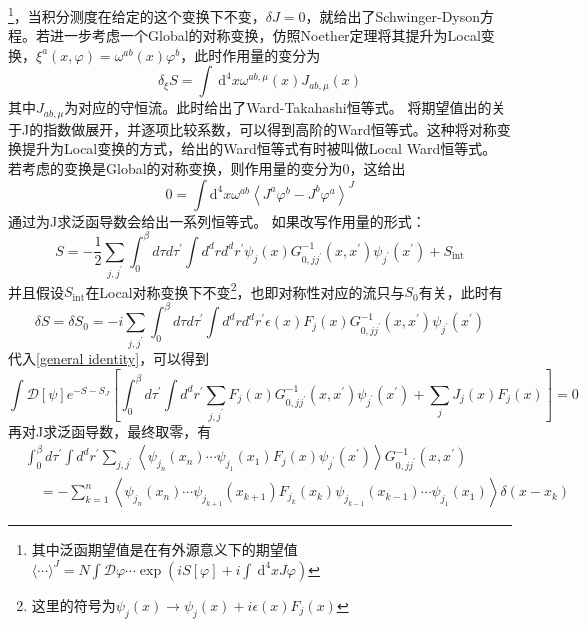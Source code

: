 \documentclass[10pt,openany]{book}
\theoremstyle{thmstyle} %
\theoremstyle{defstyle} %
\theoremstyle{prostyle} %
\begin{document}
\footnote{其中泛函期望值是在有外源意义下的期望值$ \langle\cdots\rangle^J=N \int \mathcal{D} \varphi \cdots \exp \left(i S[\varphi]+i \int \mathrm{~d}^4 x J \varphi\right) $}，当积分测度在给定的这个变换下不变，$ \delta J=0 $，就给出了Schwinger-Dyson方程。若进一步考虑一个Global的对称变换，仿照Noether定理将其提升为Local变换，$ \xi^a(x, \varphi)=\omega^{a b}(x) \varphi^b $，此时作用量的变分为
\begin{equation}
  \delta_{\xi} S=\int \mathrm{~d}^4 x \omega^{a b,\mu}(x) J_{a b, \mu}(x)
\end{equation}
其中$ J_{a b, \mu} $为对应的守恒流。此时给出了Ward-Takahashi恒等式。 将期望值出的关于J的指数做展开，并逐项比较系数，可以得到高阶的Ward恒等式。这种将对称变换提升为Local变换的方式，给出的Ward恒等式有时被叫做Local Ward恒等式。\\
若考虑的变换是Global的对称变换，则作用量的变分为0，这给出
\begin{equation}
  0=\int \mathrm{d}^4 x \omega^{a b}\left\langle J^a \varphi^b-J^b \varphi^a\right\rangle^J
\end{equation}
通过为J求泛函导数会给出一系列恒等式。
如果改写作用量的形式：
\begin{equation*}
  S=-\frac{1}{2} \sum_{j, j^{\prime}} \int_0^\beta d \tau d \tau^{\prime} \int d^d r d^d r^{\prime} \psi_j(x) G_{0, j j^{\prime}}^{-1}\left(x, x^{\prime}\right) \psi_{j^{\prime}}\left(x^{\prime}\right)+S_{\mathrm{int}}
\end{equation*}
并且假设$ S_{\mathrm{int}} $在Local对称变换下不变\footnote{这里的符号为$ \psi_j(x) \rightarrow \psi_j(x)+i \epsilon(x) F_j(x) $ }，也即对称性对应的流只与$ S_0 $有关，此时有
\begin{equation*}
  \delta S=\delta S_0=-i \sum_{j, j^{\prime}} \int_0^\beta d \tau d \tau^{\prime} \int d^d r d^d r^{\prime} \epsilon(x) F_j(x) G_{0, j j^{\prime}}^{-1}\left(x, x^{\prime}\right) \psi_{j^{\prime}}\left(x^{\prime}\right)
\end{equation*}
代入\eqref{general identity}，可以得到
\begin{equation}
  \int \mathcal{D}[\psi] e^{-S-S_J}\left[\int_0^\beta d \tau^{\prime} \int d^d r^{\prime} \sum_{j, j^{\prime}} F_j(x) G_{0, j j^{\prime}}^{-1}\left(x, x^{\prime}\right) \psi_{j^{\prime}}\left(x^{\prime}\right)+\sum_j J_j(x) F_j(x)\right]=0
  \label{local ward identity in green function form}
\end{equation}
再对J求泛函导数，最终取零，有
\begin{equation}
  \begin{aligned}
& \int_0^\beta d \tau^{\prime} \int d^d r^{\prime} \sum_{j, j^{\prime}}\left\langle\psi_{j_n}\left(x_n\right) \cdots \psi_{j_1}\left(x_1\right) F_j(x) \psi_{j^{\prime}}\left(x^{\prime}\right)\right\rangle G_{0, j j^{\prime}}^{-1}\left(x, x^{\prime}\right) \\
& \quad=-\sum_{k=1}^n\left\langle\psi_{j_n}\left(x_n\right) \cdots \psi_{j_{k+1}}\left(x_{k+1}\right) F_{j_k}\left(x_k\right) \psi_{j_{k-1}}\left(x_{k-1}\right) \cdots \psi_{j_1}\left(x_1\right)\right\rangle \delta\left(x-x_k\right)
\end{aligned}
\end{equation}   
\end{document}
